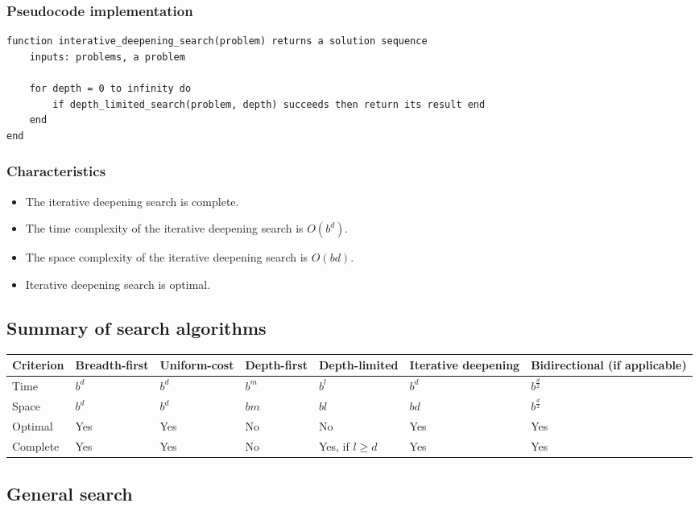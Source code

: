 \documentclass[11pt]{article}
\begin{document}
\subsubsection{Pseudocode implementation}
\label{sec:org2b7b0bd}
\begin{verbatim}
function interative_deepening_search(problem) returns a solution sequence
    inputs: problems, a problem

    for depth = 0 to infinity do
        if depth_limited_search(problem, depth) succeeds then return its result end
    end
end
\end{verbatim}
\subsubsection{Characteristics}
\label{sec:org5fd6a72}
\begin{itemize}
\item The iterative deepening search is complete.
\item The time complexity of the iterative deepening search is \(O(b^d)\).
\item The space complexity of the iterative deepening search is \(O(bd)\).
\item Iterative deepening search is optimal.
\end{itemize}
\subsection{Summary of search algorithms}
\label{sec:org86fd6ac}
\begin{center}
\begin{tabular}{|m{5em}|m{4em}|m{4em}|m{4em}|m{4em}|m{5em}|m{6em}|}
\hline
Criterion & Breadth-first & Uniform-cost & Depth-first & Depth-limited & Iterative deepening & Bidirectional (if applicable)\\
\hline
Time & \(b^d\) & \(b^d\) & \(b^m\) & \(b^l\) & \(b^d\) & \(b^{\frac{d}{2}}\)\\
\hline
Space & \(b^d\) & \(b^d\) & \(bm\) & \(bl\) & \(bd\) & \(b^{\frac{d}{2}}\)\\
\hline
Optimal & Yes & Yes & No & No & Yes & Yes\\
\hline
Complete & Yes & Yes & No & Yes, if \(l \ge d\) & Yes & Yes\\
\hline
\end{tabular}
\end{center}

 \newpage
\subsection{General search}
\label{sec:org10ffad5}
\end{document}
